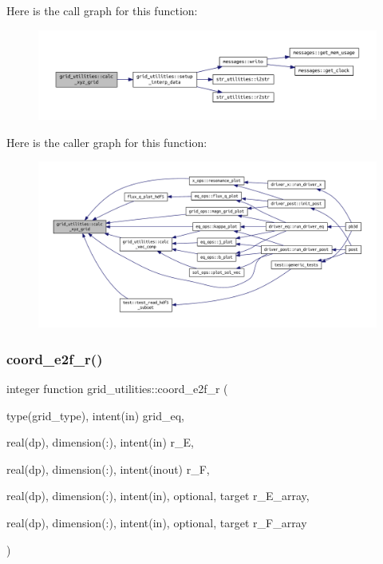 Here is the call graph for this function\+:
\nopagebreak
\begin{figure}[H]
\begin{center}
\leavevmode
\includegraphics[width=350pt]{namespacegrid__utilities_a39e7cd9b8f173994358dbdd6b57827e1_cgraph}
\end{center}
\end{figure}
Here is the caller graph for this function\+:
\nopagebreak
\begin{figure}[H]
\begin{center}
\leavevmode
\includegraphics[width=350pt]{namespacegrid__utilities_a39e7cd9b8f173994358dbdd6b57827e1_icgraph}
\end{center}
\end{figure}
\mbox{\label{namespacegrid__utilities_a7866b2c198255dec7904dac73ccf4340}} 
\subsubsection{\texorpdfstring{coord\+\_\+e2f\+\_\+r()}{coord\_e2f\_r()}}
{\footnotesize\ttfamily integer function grid\+\_\+utilities\+::coord\+\_\+e2f\+\_\+r (\begin{DoxyParamCaption}\item[{type(grid\+\_\+type), intent(in)}]{grid\+\_\+eq,  }\item[{real(dp), dimension(\+:), intent(in)}]{r\+\_\+E,  }\item[{real(dp), dimension(\+:), intent(inout)}]{r\+\_\+F,  }\item[{real(dp), dimension(\+:), intent(in), optional, target}]{r\+\_\+\+E\+\_\+array,  }\item[{real(dp), dimension(\+:), intent(in), optional, target}]{r\+\_\+\+F\+\_\+array }\end{DoxyParamCaption})}



